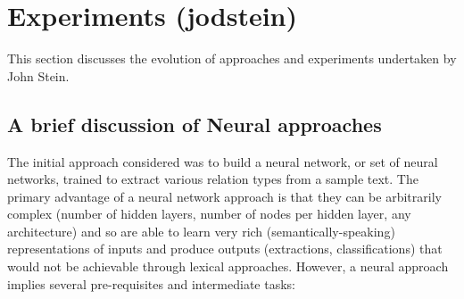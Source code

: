 \documentclass[11pt,letterpaper]{article}
\begin{document}
\section{Experiments (jodstein)}\label{jodstein_experiments}

This section discusses the evolution of approaches and experiments undertaken by John Stein.

\subsection{A brief discussion of Neural approaches}
The initial approach considered was to build a neural network, or set of neural networks, trained to extract various relation types from a sample text.  The primary advantage of a neural network approach is that they can be arbitrarily complex (number of hidden layers, number of nodes per hidden layer, any architecture) and so are able to learn very rich (semantically-speaking) representations of inputs and produce outputs (extractions, classifications) that would not be achievable through lexical approaches.  However, a neural approach implies several pre-requisites and intermediate tasks:
\end{document}
